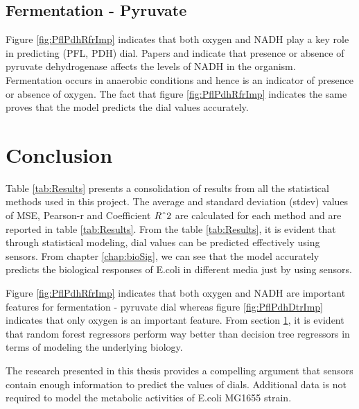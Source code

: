 \documentclass[12pt,chapterheads]{ucsd}
\begin{document}
\section{Fermentation - Pyruvate}\label{sec:pflpdhImp}
Figure \ref{fig:PflPdhRfrImp} indicates that both oxygen and NADH play a key role in predicting (PFL, PDH) dial. Papers \cite{pmid2655695} and \cite{pmid22343352} indicate that presence or absence of pyruvate dehydrogenase affects the levels of NADH in the organism. Fermentation occurs in anaerobic conditions and hence is an indicator of presence or absence of oxygen. The fact that figure \ref{fig:PflPdhRfrImp} indicates the same proves that the model predicts the dial values accurately.


\chapter{Conclusion}
Table \ref{tab:Results} presents a consolidation of results from all the statistical methods used in this project. The average and standard deviation (stdev) values of MSE, Pearson-r and Coefficient $R\string^2$ are calculated for each method and are reported in table \ref{tab:Results}. From the table \ref{tab:Results}, it is evident that through statistical modeling, dial values can be predicted effectively using sensors. From chapter \ref{chap:bioSig}, we can see that the model accurately predicts the biological responses of E.coli in different media just by using sensors. 

Figure \ref{fig:PflPdhRfrImp} indicates that both oxygen and NADH are important features for fermentation - pyruvate dial whereas figure \ref{fig:PflPdhDtrImp} indicates that only oxygen is an important feature. From section \ref{sec:pflpdhImp}, it is evident that random forest regressors perform way better than decision tree regressors in terms of modeling the underlying biology. 

The research presented in this thesis provides a compelling argument that sensors contain enough information to predict the values of dials. Additional data is not required to model the metabolic activities of E.coli MG1655 strain.
\end{document}
